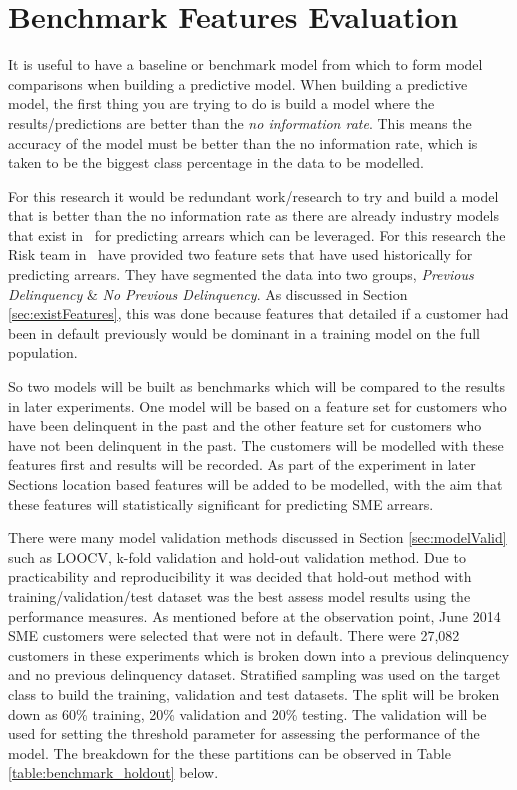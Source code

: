 \section{Benchmark Features Evaluation}\label{sec:benchFeature}
It is useful to have a baseline or benchmark model from which to form model comparisons when building a predictive model. When building a predictive model, the first thing you are trying to do is build a model where the results/predictions are better than the \textit{no information rate}. This means the accuracy of the model must be better than the no information rate, which is taken to be the biggest class percentage in the data to be modelled. 

For this research it would be redundant work/research to try and build a model that is better than the no information rate as there are already industry models that exist in \subjectname\ for predicting arrears which can be leveraged. For this research the Risk team in \subjectname\ have provided two feature sets that have used historically for predicting arrears. They have segmented the data into two groups, \textit{Previous Delinquency} \& \textit{No Previous Delinquency}. As discussed in Section \ref{sec:existFeatures}, this was done because features that detailed if a customer had been in default previously would be dominant in a training model on the full population.

So two models will be built as benchmarks which will be compared to the results in later experiments. One model will be based on a feature set for customers who have been delinquent in the past and the other feature set for customers who have not been delinquent in the past. The customers will be modelled with these features first and results will be recorded. As part of the experiment in later Sections location based features will be added to be modelled, with the aim that these features will statistically significant for predicting SME arrears. 

There were many model validation methods discussed in Section \ref{sec:modelValid} such as LOOCV, k-fold validation and hold-out validation method. Due to practicability and reproducibility it was decided that hold-out method with training/validation/test dataset was the best assess model results using the performance measures. As mentioned before at the observation point, June 2014 SME customers were selected that were not in default. There were 27,082 customers in these experiments which is broken down into a previous delinquency and no previous delinquency dataset. Stratified sampling was used on the target class to build the training, validation and test datasets. The split will be broken down as 60\% training, 20\% validation and 20\% testing. The validation will be used for setting the threshold parameter for assessing the performance of the model. The breakdown for the these partitions can be observed in Table \ref{table:benchmark_holdout} below. 

